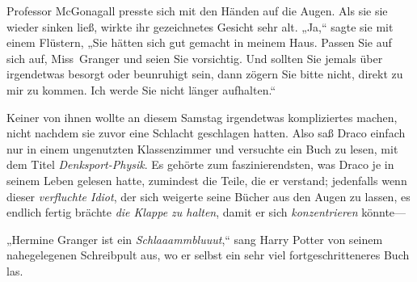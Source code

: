 Professor McGonagall presste sich mit den Händen auf die Augen. Als sie sie wieder sinken ließ, wirkte ihr gezeichnetes Gesicht sehr alt. „Ja,“ sagte sie mit einem Flüstern, „Sie hätten sich gut gemacht in meinem Haus. Passen Sie auf sich auf, Miss~Granger und seien Sie vorsichtig. Und sollten Sie jemals über irgendetwas besorgt oder beunruhigt sein, dann zögern Sie bitte nicht, direkt zu mir zu kommen. Ich werde Sie nicht länger aufhalten.“


Keiner von ihnen wollte an diesem Samstag irgendetwas kompliziertes machen, nicht nachdem sie zuvor eine Schlacht geschlagen hatten. Also saß Draco einfach nur in einem ungenutzten Klassenzimmer und versuchte ein Buch zu lesen, mit dem Titel \emph{Denksport-Physik}.
Es gehörte zum faszinierendsten, was Draco je in seinem Leben gelesen hatte, zumindest die Teile, die er verstand; jedenfalls wenn dieser \emph{verfluchte Idiot}, der sich weigerte seine Bücher aus den Augen zu lassen, es endlich fertig brächte \emph{die Klappe zu halten}, damit er sich \emph{konzentrieren} könnte—

„Hermine Granger ist ein \emph{Schlaaammbluuut},“ sang Harry Potter von seinem nahegelegenen Schreibpult aus, wo er selbst ein sehr viel fortgeschritteneres Buch las.

